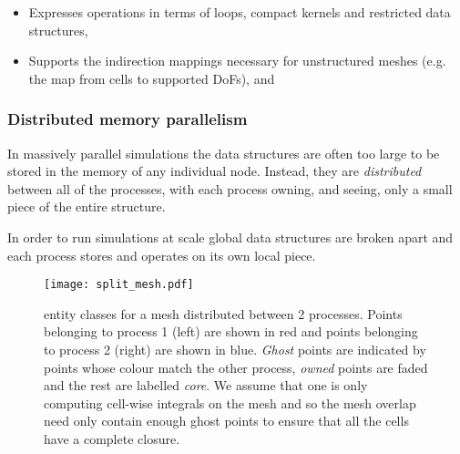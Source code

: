 \documentclass[thesis]{subfiles}
\begin{document}
\begin{itemize}
  \item
    Expresses operations in terms of loops, compact kernels and restricted data structures,
  \item
    Supports the indirection mappings necessary for unstructured meshes (e.g. the map from cells to supported DoFs), and
\end{itemize}




\subsubsection{Distributed memory parallelism}
\label{sec:intro_mpi}


In massively parallel simulations the data structures are often too large to be stored in the memory of any individual node.
Instead, they are \textit{distributed} between all of the processes, with each process owning, and seeing, only a small piece of the entire structure.

In order to run simulations at scale global data structures are broken apart and each process stores and operates on its own local piece.

\begin{figure}
  \centering
  \texttt{[image: split\_mesh.pdf]}
  \caption{
     entity classes for a mesh distributed between 2 processes.
    Points belonging to process 1 (left) are shown in red and points belonging to process 2 (right) are shown in blue.
    \textit{Ghost} points are indicated by points whose colour match the other process, \textit{owned} points are faded and the rest are labelled \textit{core}.
    We assume that one is only computing cell-wise integrals on the mesh and so the mesh overlap need only contain enough ghost points to ensure that all the cells have a complete closure.
  }
  \label{fig:pyop2_split_mesh}
\end{figure}

\end{document}
